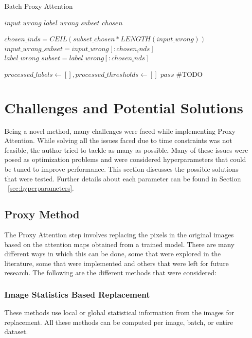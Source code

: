 \begin{algorithm}
    \caption{Batch Proxy Attention}
    \label{alg:proxy_attention_batch}
    \begin{algorithmic}
        \REQUIRE $input\_wrong$
        \REQUIRE $label\_wrong$
        \REQUIRE $subset\_chosen$

        \STATE $chosen\_inds = CEIL(subset\_chosen * LENGTH(input\_wrong))$
        \STATE $input\_wrong\_subset = input\_wrong[:chosen_inds]$
        \STATE $label\_wrong\_subset = label\_wrong[:chosen_inds]$

        \STATE $processed\_labels \leftarrow [], processed\_thresholds \leftarrow []$
        \STATE $pass$ \#TODO
        \ENDFOR

    \end{algorithmic}
\end{algorithm}

\section{Challenges and Potential Solutions}
Being a novel method, many challenges were faced while implementing Proxy Attention. While solving all the issues faced due to time constraints was not feasible, the author tried to tackle as many as possible. Many of these issues were posed as optimization problems and were considered hyperparameters that could be tuned to improve performance. This section discusses the possible solutions that were tested. Further details about each parameter can be found in Section ~\ref{sec:hyperparameters}.

\subsection{Proxy Method}
The Proxy Attention step involves replacing the pixels in the original images based on the attention maps obtained from a trained model. There are many different ways in which this can be done, some that were explored in the literature, some that were implemented and others that were left for future research. The following are the different methods that were considered:

\subsubsection{Image Statistics Based Replacement}
These methods use local or global statistical information from the images for replacement. All these methods can be computed per image, batch, or entire dataset.

